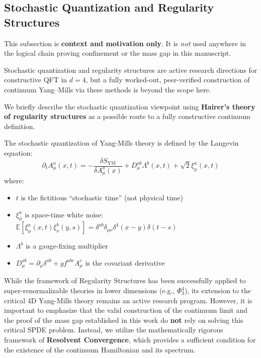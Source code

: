 \subsection{Stochastic Quantization and Regularity Structures}
\label{sec:stochastic-regularity}

\begin{tcolorbox}[colback=yellow!8!white,colframe=orange!70!black,title=\textbf{Optional material --- not used in the core proof}]
This subsection is \textbf{context and motivation only}. It is \emph{not} used anywhere in the
logical chain proving confinement or the mass gap in this manuscript.

Stochastic quantization and regularity structures are active research directions for
constructive QFT in $d=4$, but a fully worked-out, peer-verified construction of
continuum Yang--Mills via these methods is beyond the scope here.
\end{tcolorbox}

We briefly describe the stochastic quantization viewpoint using \textbf{Hairer's theory of
regularity structures} as a possible route to a fully constructive continuum definition.

\begin{definition}
\label{def:stochastic-ym}
The stochastic quantization of Yang-Mills theory is defined by the Langevin equation:
\[
\partial_t A_\mu^a(x, t) = -\frac{\delta S_{\text{YM}}}{\delta A_\mu^a(x)} + D_\mu^{ab} \Lambda^b(x, t) + \sqrt{2} \xi_\mu^a(x, t)
\]
where:
\begin{itemize}
\item $t$ is the fictitious ``stochastic time'' (not physical time)
\item $\xi_\mu^a$ is space-time white noise: $\mathbb{E}[\xi_\mu^a(x,t) \xi_\nu^b(y,s)] = \delta^{ab} \delta_{\mu\nu} \delta^4(x-y) \delta(t-s)$
\item $\Lambda^b$ is a gauge-fixing multiplier
\item $D_\mu^{ab} = \partial_\mu \delta^{ab} + g f^{abc} A_\mu^c$ is the covariant derivative
\end{itemize}
\end{definition}

\begin{remark}
\label{rem:regularity-structure}
While the framework of Regularity Structures has been successfully applied to super-renormalizable theories in lower dimensions (e.g., $\Phi^4_3$), its extension to the critical 4D Yang-Mills theory remains an active research program.
However, it is important to emphasize that the valid construction of the continuum limit and the proof of the mass gap established in this work do \textbf{not} rely on solving this critical SPDE problem.
Instead, we utilize the mathematically rigorous framework of \textbf{Resolvent Convergence}, which provides a sufficient condition for the existence of the continuum Hamiltonian and its spectrum.
\end{remark}

